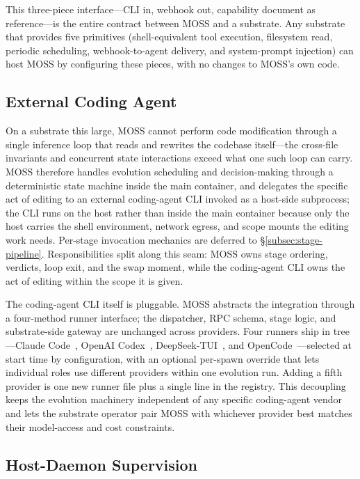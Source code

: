 \documentclass{article}
\begin{document}
This three-piece interface---CLI in, webhook out, capability document as reference---is the entire contract between MOSS and a substrate. Any substrate that provides five primitives (shell-equivalent tool execution, filesystem read, periodic scheduling, webhook-to-agent delivery, and system-prompt injection) can host MOSS by configuring these pieces, with no changes to MOSS's own code.

\subsection{External Coding Agent}
\label{subsec:external-coding-agent}

On a substrate this large, MOSS cannot perform code modification through a single inference loop that reads and rewrites the codebase itself---the cross-file invariants and concurrent state interactions exceed what one such loop can carry. MOSS therefore handles evolution scheduling and decision-making through a deterministic state machine inside the main container, and delegates the specific act of editing to an external coding-agent CLI invoked as a host-side subprocess; the CLI runs on the host rather than inside the main container because only the host carries the shell environment, network egress, and scope mounts the editing work needs. Per-stage invocation mechanics are deferred to \S\ref{subsec:stage-pipeline}. Responsibilities split along this seam: MOSS owns stage ordering, verdicts, loop exit, and the swap moment, while the coding-agent CLI owns the act of editing within the scope it is given.

The coding-agent CLI itself is pluggable. MOSS abstracts the integration through a four-method runner interface; the dispatcher, RPC schema, stage logic, and substrate-side gateway are unchanged across providers. Four runners ship in tree---Claude Code~\citep{claude-code}, OpenAI Codex~\citep{openai-codex-cli}, DeepSeek-TUI~\citep{deepseek-tui}, and OpenCode~\citep{opencode}---selected at start time by configuration, with an optional per-spawn override that lets individual roles use different providers within one evolution run. Adding a fifth provider is one new runner file plus a single line in the registry. This decoupling keeps the evolution machinery independent of any specific coding-agent vendor and lets the substrate operator pair MOSS with whichever provider best matches their model-access and cost constraints.

\subsection{Host-Daemon Supervision}
\label{subsec:host-daemon}
\end{document}
